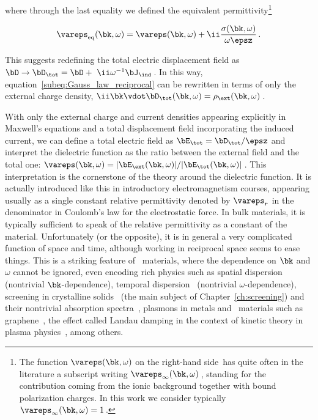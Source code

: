 \noindent where through the last equality we defined the equivalent permittivity\footnote{The function $\vareps (\bk,\omega)$ on the right-hand side~has quite often in the literature a subscript writing $\vareps_\infty(\bk,\omega)$\,, standing for the contribution coming from the ionic background together with bound polarization charges. In this work we consider typically $\vareps_\infty(\bk,\omega) = 1$\,.}

\begin{equation}
\label{eq:equivalent_permittivity}
    \vareps_{\text{eq}}(\bk,\omega) = \vareps (\bk,\omega) + \ii \frac{\sigma(\bk,\omega)}{\omega \epsz} \,.
\end{equation}


\noindent This suggests redefining the total electric displacement field as $\bD \to \bD_\tot  = \bD +~\ii \omega^{-1} \bJ_\ind$\,.
In this way, equation~\eqref{subeq:Gauss_law_reciprocal} can be rewritten in terms of only the external charge density, $ \ii \bk \vdot \bD_\tot(\bk,\omega) = \rho_\ext(\bk,\omega)$\,.

With only the external charge and current densities appearing explicitly in Maxwell's equations and a total displacement field incorporating the induced current, we can define a total electric field as $\bE_\tot = \bD_\tot/\epsz$ and interpret the dielectric function as the ratio between the external field and the total one: $\vareps(\bk,\omega) = |\bE_\ext(\bk,\omega)|/|\bE_\tot(\bk,\omega)|$\,.
This interpretation is the cornerstone of the theory around the dielectric function.
It is actually introduced like this in introductory electromagnetism courses, appearing usually as a single constant relative permittivity denoted by $\vareps_r$ in the denominator in Coulomb's law for the electrostatic force.
In bulk materials, it is typically sufficient to speak of the relative permittivity as a constant of the material.
Unfortunately (or the opposite), it is in general a very complicated function of space and time, although working in reciprocal space seems to ease things.
This is a striking feature of \bd~materials, where the dependence on $\bk$ and $\omega$ cannot be ignored, even encoding rich physics such as spatial dispersion~\cite{Kinsler_2021} (nontrivial $\bk$-dependence), temporal dispersion~\cite{Koutserimpas_2024} (nontrivial $\omega$-dependence), screening in crystalline solids~\cite{Nozieres_Pines_1958} (the main subject of Chapter~\ref{ch:screening}) and their nontrivial absorption spectra~\cite{Cardona_1987,Palik_1991,Logothetidis_Petalas_1996,Wang_Berkelbach_2021}, plasmons in metals and \bd~materials such as graphene~\cite{GoncalvesPeres:2016,Novoselov_Geim_2004}, the effect called Landau damping in the context of kinetic theory in plasma physics~\cite{Chen_Plasma_Physics}, among others.

